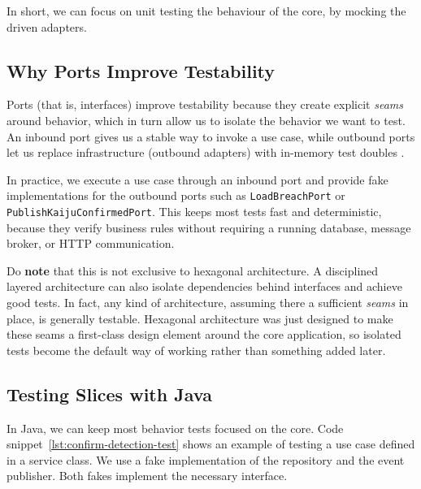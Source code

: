 In short, we can focus on unit testing the behaviour of the core, by mocking  the driven adapters.



\subsection{Why Ports Improve Testability}
\label{sec:hexagonal_why_ports_testability}

Ports (that is, interfaces) improve testability because they create explicit \textit{seams}  around behavior, which in turn allow us to isolate the behavior we want to test. An inbound port gives us a stable way to invoke a use case, while outbound ports let us replace infrastructure (outbound adapters) with in-memory test doubles .

In practice, we execute a use case through an inbound port and provide fake implementations for the outbound ports such as \texttt{LoadBreachPort} or \texttt{PublishKaijuConfirmedPort}. This keeps most tests fast and deterministic, because they verify business rules without requiring a running database, message broker, or HTTP communication.

Do \textbf{note} that this is not exclusive to hexagonal architecture. A disciplined layered architecture can also isolate dependencies behind interfaces and achieve good tests. In fact, any kind of architecture, assuming there a sufficient \textit{seams} in place, is generally testable. Hexagonal architecture was just designed to make these seams a first-class design element around the core application, so isolated tests become the default way of working rather than something added later.

\subsection{Testing Slices with Java}
\label{sec:hexagonal_java_testing_slices}

In Java, we can keep most behavior tests focused on the core. Code snippet~\ref{lst:confirm-detection-test} shows an example of testing a use case defined in a service class. We use a fake implementation of the repository and the event publisher. Both fakes implement the necessary interface.

